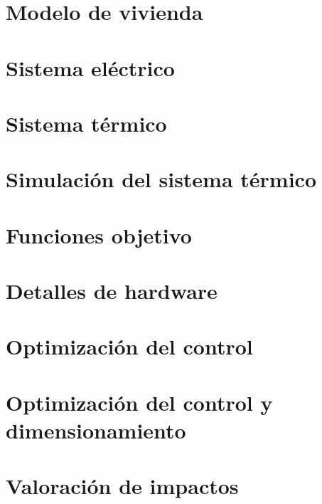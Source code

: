 \section{Modelo de vivienda}
\label{sec:modelo_vivienda}


\clearpage
\section{Sistema eléctrico}
\label{sec:sistema_electrico}


\clearpage
\section{Sistema térmico}
\label{sec:sistema_termico}


\clearpage
\section{Simulación del sistema térmico}


\clearpage
\section{Funciones objetivo}
\label{sec:funciones_objetivo}


\clearpage
\section{Detalles de hardware}
\label{sec:computer}


\clearpage
\section{Optimización del control}
\label{sec:control}


\clearpage
\section{Optimización del control y dimensionamiento}
\label{sec:control_y_dimensionamiento}


\clearpage
\section{Valoración de impactos}

